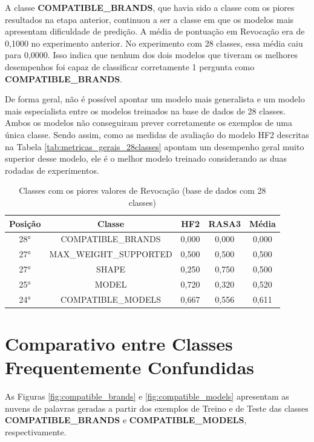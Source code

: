 A classe \textbf{COMPATIBLE\_BRANDS}, que havia sido a classe com os piores resultados na etapa anterior, continuou a ser a classe em que os modelos mais apresentam dificuldade de predição. A média de pontuação em Revocação era de 0,1000 no experimento anterior. No experimento com 28 classes, essa média caiu para 0,0000. Isso indica que nenhum dos dois modelos que tiveram os melhores desempenhos foi capaz de classificar corretamente 1 pergunta como \textbf{COMPATIBLE\_BRANDS}.

De forma geral, não é possível apontar um modelo mais generalista e um modelo mais especialista entre os modelos treinados na base de dados de 28 classes. Ambos os modelos não conseguiram prever corretamente os exemplos de uma única classe. Sendo assim, como as medidas de avaliação do modelo HF2 descritas na Tabela \ref{tab:metricas_gerais_28classes} apontam um desempenho geral muito superior desse modelo, ele é o melhor modelo treinado considerando as duas rodadas de experimentos.

\begin{table}[!ht]
\centering
\caption{Classes com os piores valores de Revocação (base de dados com 28 classes)}
\label{tab:piores_classes_revocação_28_classes}
\begin{tabular}{|c|c|c|c|c|}
\hline
\textbf{Posição} & \textbf{Classe} & \textbf{HF2} & \textbf{RASA3} & \textbf{Média} \\
\hline
28° & COMPATIBLE\_BRANDS & 0,000 & 0,000 & 0,000 \\
\hline
27° & MAX\_WEIGHT\_SUPPORTED & 0,500 & 0,500 & 0,500 \\
\hline
27° & SHAPE & 0,250 & 0,750 & 0,500 \\
\hline
25° & MODEL & 0,720 & 0,320 & 0,520 \\
\hline
24° & COMPATIBLE\_MODELS & 0,667 & 0,556 & 0,611 \\
\hline
\end{tabular}
\end{table}

\section{Comparativo entre Classes Frequentemente Confundidas}
\label{res:comparativo_entre_classes_confundidas}
As Figuras \ref{fig:compatible_brands} e \ref{fig:compatible_models} apresentam as nuvens de palavras geradas a partir dos exemplos de Treino e de Teste das classes \textbf{COMPATIBLE\_BRANDS} e \textbf{COMPATIBLE\_MODELS}, respectivamente.

